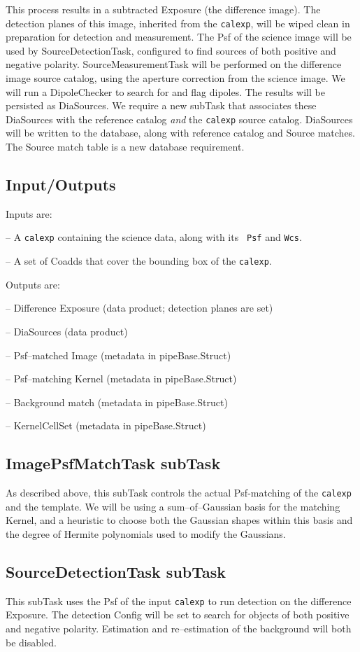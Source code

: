 \documentclass[12pt]{article}
\begin{document}
This process results in a subtracted Exposure (the difference image).
The detection planes of this image, inherited from the {\tt calexp},
will be wiped clean in preparation for detection and measurement.  The
Psf of the science image will be used by SourceDetectionTask,
configured to find sources of both positive and negative polarity.
SourceMeasurementTask will be performed on the difference image source
catalog, using the aperture correction from the science image.  We
will run a DipoleChecker to search for and flag
dipoles.  The results will be persisted as DiaSources.  We require a
new subTask that associates these DiaSources with the reference
catalog {\it and} the {\tt calexp} source catalog.  DiaSources will be written to the database,
along with reference catalog and Source matches.  The Source match
table is a new database requirement.

\subsection{Input/Outputs}

Inputs are:

-- A {\tt calexp} containing the science data, along with its {\tt
  Psf} and {\tt Wcs}.

-- A set of Coadds that cover the bounding box of the {\tt calexp}.

Outputs are:

-- Difference Exposure (data product; detection planes are set)

-- DiaSources (data product)

-- Psf--matched Image (metadata in pipeBase.Struct)

-- Psf--matching Kernel (metadata in pipeBase.Struct)

-- Background match (metadata in pipeBase.Struct)

-- KernelCellSet (metadata in pipeBase.Struct)

\subsection{ImagePsfMatchTask subTask}
As described above, this subTask controls the actual Psf-matching of
the {\tt calexp} and the template.  We will be using a
sum--of--Gaussian basis for the matching Kernel, and a heuristic to
choose both the Gaussian shapes within this basis and the degree of
Hermite polynomials used to modify the Gaussians.

\subsection{SourceDetectionTask subTask}
This subTask uses the Psf of the input {\tt calexp} to run detection
on the difference Exposure.  The detection Config will be set to
search for objects of both positive and negative polarity.  Estimation
and re--estimation of the background will both be disabled.
\end{document}
